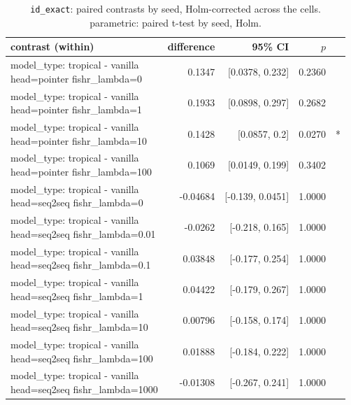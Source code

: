 \documentclass[10pt]{article}
\makeatletter
\newcommand{\stackcell}[1]{\begin{tabular}[t]{@{}l@{}}#1\end{tabular}}
\makeatother
\begin{document}
{\small
\begin{longtable}{lrrrl}
\caption{\texttt{id\_exact}: paired contrasts by seed, Holm-corrected across the cells. parametric: paired t-test by seed, Holm.}\label{tab:paired-id_exact}\\
\toprule
contrast (within) & difference & 95\% CI & $p$ & \\
\midrule
\endhead
\stackcell{model\_type: tropical - vanilla\\\footnotesize head=pointer fishr\_lambda=0 } & 0.1347 & [0.0378, 0.232] & 0.2360 & \\
\stackcell{model\_type: tropical - vanilla\\\footnotesize head=pointer fishr\_lambda=1 } & 0.1933 & [0.0898, 0.297] & 0.2682 & \\
\stackcell{model\_type: tropical - vanilla\\\footnotesize head=pointer fishr\_lambda=10 } & 0.1428 & [0.0857, 0.2] & 0.0270 & *\\
\stackcell{model\_type: tropical - vanilla\\\footnotesize head=pointer fishr\_lambda=100 } & 0.1069 & [0.0149, 0.199] & 0.3402 & \\
\stackcell{model\_type: tropical - vanilla\\\footnotesize head=seq2seq fishr\_lambda=0 } & -0.04684 & [-0.139, 0.0451] & 1.0000 & \\
\stackcell{model\_type: tropical - vanilla\\\footnotesize head=seq2seq fishr\_lambda=0.01 } & -0.0262 & [-0.218, 0.165] & 1.0000 & \\
\stackcell{model\_type: tropical - vanilla\\\footnotesize head=seq2seq fishr\_lambda=0.1 } & 0.03848 & [-0.177, 0.254] & 1.0000 & \\
\stackcell{model\_type: tropical - vanilla\\\footnotesize head=seq2seq fishr\_lambda=1 } & 0.04422 & [-0.179, 0.267] & 1.0000 & \\
\stackcell{model\_type: tropical - vanilla\\\footnotesize head=seq2seq fishr\_lambda=10 } & 0.00796 & [-0.158, 0.174] & 1.0000 & \\
\stackcell{model\_type: tropical - vanilla\\\footnotesize head=seq2seq fishr\_lambda=100 } & 0.01888 & [-0.184, 0.222] & 1.0000 & \\
\stackcell{model\_type: tropical - vanilla\\\footnotesize head=seq2seq fishr\_lambda=1000 } & -0.01308 & [-0.267, 0.241] & 1.0000 & \\

\end{longtable}}
\end{document}
